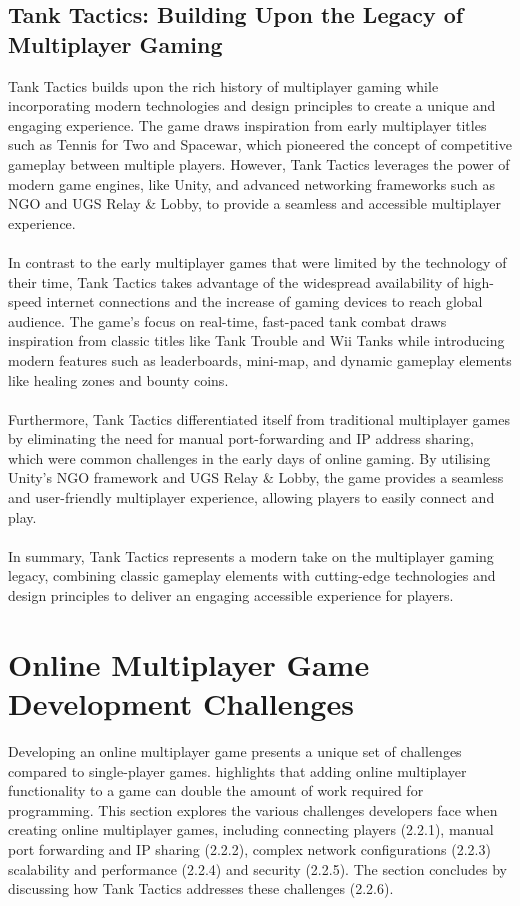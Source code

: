 \subsection{Tank Tactics: Building Upon the Legacy of Multiplayer Gaming}
Tank Tactics builds upon the rich history of multiplayer gaming while incorporating modern technologies and design principles to create a unique and engaging experience. The game draws inspiration from early multiplayer titles such as Tennis for Two and Spacewar, which pioneered the concept of competitive gameplay between multiple players. However, Tank Tactics leverages the power of modern game engines, like Unity, and advanced networking frameworks such as NGO and UGS Relay \& Lobby, to provide a seamless and accessible multiplayer experience.
\\
\noindent
\\
In contrast to the early multiplayer games that were limited by the technology of their time, Tank Tactics takes advantage of the widespread availability of high-speed internet connections and the increase of gaming devices to reach global audience. The game's focus on real-time, fast-paced tank combat draws inspiration from classic titles like Tank Trouble and Wii Tanks while introducing modern features such as leaderboards, mini-map, and dynamic gameplay elements like healing zones and bounty coins.
\\
\noindent
\\
Furthermore, Tank Tactics differentiated itself from traditional multiplayer games by eliminating the need for manual port-forwarding and IP address sharing, which were common challenges in the early days of online gaming. By utilising Unity's NGO framework and UGS Relay \& Lobby, the game provides a seamless and user-friendly multiplayer experience, allowing players to easily connect and play.
\\
\noindent
\\
In summary, Tank Tactics represents a modern take on the multiplayer gaming legacy, combining classic gameplay elements with cutting-edge technologies and design principles to deliver an engaging accessible experience for players.

\section{Online Multiplayer Game Development Challenges} 
Developing an online multiplayer game presents a unique set of challenges compared to single-player games. \cite{adding-mutliplayer} highlights that adding online multiplayer functionality to a game can double the amount of work required for programming. This section explores the various challenges developers face when creating online multiplayer games, including connecting players (2.2.1), manual port forwarding and IP sharing (2.2.2), complex network configurations (2.2.3) scalability and performance (2.2.4) and security (2.2.5). The section concludes by discussing how Tank Tactics addresses these challenges (2.2.6).

